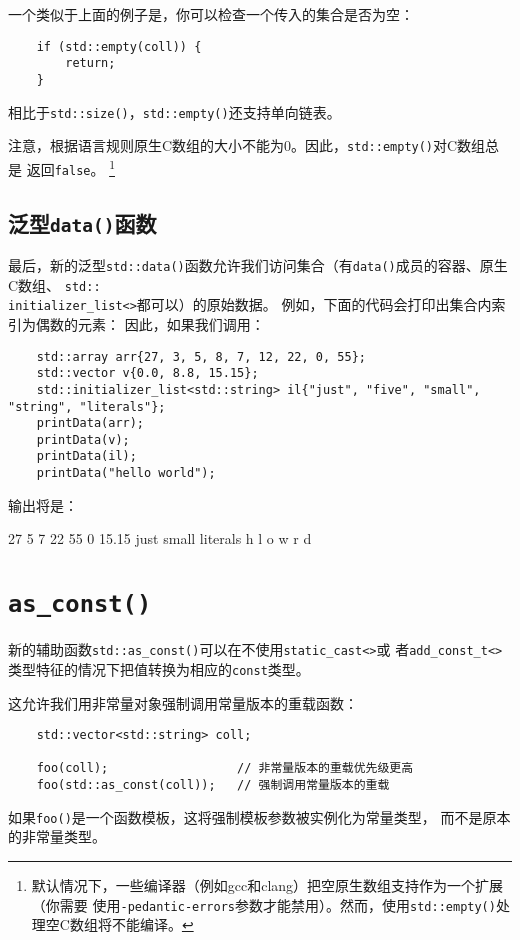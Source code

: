 一个类似于上面的例子是，你可以检查一个传入的集合是否为空：
\begin{lstlisting}
    if (std::empty(coll)) {
        return;
    }
\end{lstlisting}
相比于\texttt{std::size()}，\texttt{std::empty()}还支持单向链表。

注意，根据语言规则原生C数组的大小不能为0。因此，\texttt{std::empty()}对C数组总是
返回\texttt{false}。
\footnote{默认情况下，一些编译器（例如gcc和clang）把空原生数组支持作为一个扩展（你需要
使用\texttt{-pedantic-errors}参数才能禁用）。然而，使用\texttt{std::empty()}处理空C数组将不能编译。}

\subsection{泛型\texttt{data()}函数}
最后，新的泛型\texttt{std::data()}函数允许我们访问集合（有\texttt{data()}成员的容器、原生C数组、
\texttt{std::\\
initializer\_list<>}都可以）的原始数据。
例如，下面的代码会打印出集合内索引为偶数的元素：
因此，如果我们调用：
\begin{lstlisting}
    std::array arr{27, 3, 5, 8, 7, 12, 22, 0, 55};
    std::vector v{0.0, 8.8, 15.15};
    std::initializer_list<std::string> il{"just", "five", "small", "string", "literals"};
    printData(arr);
    printData(v);
    printData(il);
    printData("hello world");
\end{lstlisting}
输出将是：
\begin{blacklisting}
    27 5 7 22 55
    0 15.15
    just small literals
    h l o w r d
\end{blacklisting}


\section{\texttt{as\_const()}}
新的辅助函数\texttt{std::as\_const()}可以在不使用\texttt{static\_cast<>}或
者\texttt{add\_const\_t<>}类型特征的情况下把值转换为相应的\texttt{const}类型。

这允许我们用非常量对象强制调用常量版本的重载函数：
\begin{lstlisting}
    std::vector<std::string> coll;

    foo(coll);                  // 非常量版本的重载优先级更高
    foo(std::as_const(coll));   // 强制调用常量版本的重载
\end{lstlisting}
如果\texttt{foo()}是一个函数模板，这将强制模板参数被实例化为常量类型，
而不是原本的非常量类型。

